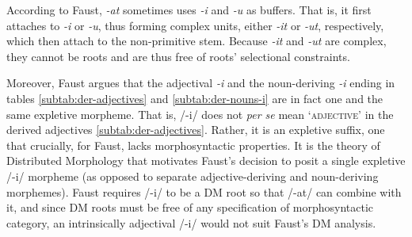 According to Faust, \textit{-at} sometimes uses \textit{-i} and 
\textit{-u} as buffers. That is, it first attaches to \textit{-i} or \textit{-u}, 
thus forming complex units, either \emph{-it} or \emph{-ut}, respectively, 
which then attach to
the non-primitive stem. Because \emph{-it} and \emph{-ut} are complex, 
they cannot be roots and are thus free of roots' selectional constraints.

Moreover, Faust argues that the adjectival \textit{-i} and 
the noun-deriving \textit{-i} ending in tables 
\ref{subtab:der-adjectives} and \ref{subtab:der-nouns-i} 
are in fact one and the same expletive morpheme. That is, 
/-i/ does not \textit{per se} mean `\textsc{adjective}' in the derived adjectives 
\ref{subtab:der-adjectives}. Rather, it is an expletive suffix, one that 
crucially, for Faust, lacks morphosyntactic properties.
It is the theory of Distributed Morphology that motivates Faust's decision to posit a single 
expletive /-i/ morpheme (as opposed to 
separate adjective-deriving and noun-deriving morphemes).  Faust 
requires /-i/ to be a DM root so that /-at/ can combine with it, and since 
DM roots must be free of any specification of morphosyntactic 
category, an intrinsically adjectival /-i/ would
not suit Faust's DM analysis. 

